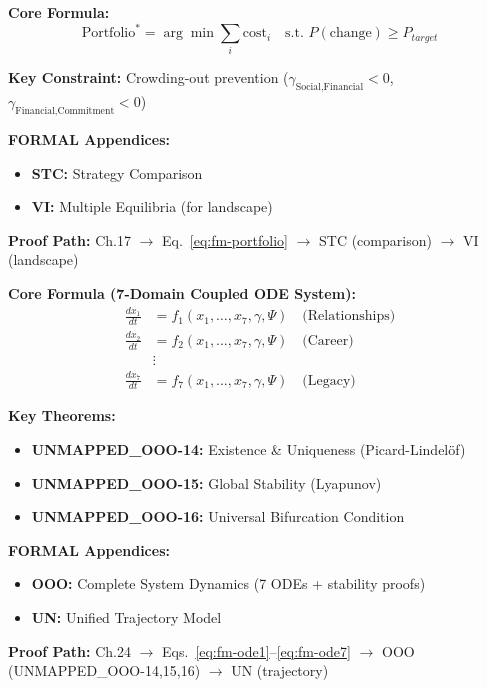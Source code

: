 \begin{tcolorbox}[colback=green!3!white, colframe=green!60!black,
    title=\textbf{Chapter 17: Intervention Design}]

\textbf{Core Formula:}
\begin{equation}
\text{Portfolio}^* = \arg\min \sum_i \text{cost}_i \quad \text{s.t. } P(\text{change}) \geq P_{target}
\label{eq:fm-portfolio}
\end{equation}

\textbf{Key Constraint:} Crowding-out prevention ($\gamma_{\text{Social,Financial}} < 0$, $\gamma_{\text{Financial,Commitment}} < 0$)

\textbf{FORMAL Appendices:}
\begin{itemize}[nosep]
    \item \textbf{STC:} Strategy Comparison
    \item \textbf{VI:} Multiple Equilibria (for landscape)
\end{itemize}

\textbf{Proof Path:} Ch.17 $\rightarrow$ Eq.~\ref{eq:fm-portfolio} $\rightarrow$ STC (comparison) $\rightarrow$ VI (landscape)

\end{tcolorbox}

\begin{tcolorbox}[colback=green!3!white, colframe=green!60!black,
    title=\textbf{Chapter 24: Emergent Life Journeys}]

\textbf{Core Formula (7-Domain Coupled ODE System):}
\begin{align}
\frac{dx_1}{dt} &= f_1(x_1, \ldots, x_7, \gamma, \Psi) \quad \text{(Relationships)} \label{eq:fm-ode1} \\
\frac{dx_2}{dt} &= f_2(x_1, \ldots, x_7, \gamma, \Psi) \quad \text{(Career)} \\
&\vdots \nonumber \\
\frac{dx_7}{dt} &= f_7(x_1, \ldots, x_7, \gamma, \Psi) \quad \text{(Legacy)} \label{eq:fm-ode7}
\end{align}

\textbf{Key Theorems:}
\begin{itemize}[nosep]
    \item \textbf{UNMAPPED_OOO-14:} Existence \& Uniqueness (Picard-Lindel\"{o}f)
    \item \textbf{UNMAPPED_OOO-15:} Global Stability (Lyapunov)
    \item \textbf{UNMAPPED_OOO-16:} Universal Bifurcation Condition
\end{itemize}

\textbf{FORMAL Appendices:}
\begin{itemize}[nosep]
    \item \textbf{OOO:} Complete System Dynamics (7 ODEs + stability proofs)
    \item \textbf{UN:} Unified Trajectory Model
\end{itemize}

\textbf{Proof Path:} Ch.24 $\rightarrow$ Eqs.~\ref{eq:fm-ode1}--\ref{eq:fm-ode7} $\rightarrow$ OOO (UNMAPPED_OOO-14,15,16) $\rightarrow$ UN (trajectory)

\end{tcolorbox}

